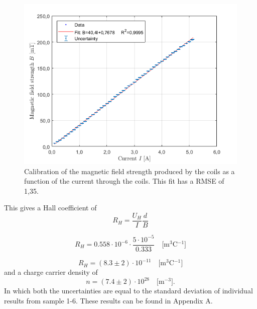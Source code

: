     \begin{figure}[!htbp]
    \begin{center}
    \includegraphics[scale=0.9]{figuren/resultaten/call_result.png}
    \end{center}
    \caption{Calibration of the magnetic field strength produced by the coils as a function of the current through the coils. This fit has a RMSE of 1,35.}\label{fig:call_result}
    \end{figure}
This gives a Hall coefficient of
    \begin{equation}
        R_H = \frac{U_H}{I} \frac{d}{B}
    \end{equation}
    
    \begin{equation}
        R_H = 0.558 \cdot 10^{-6} \cdot \frac{5\cdot 10^{-5}}{0.333} \quad \text{[m$^3$C$^{-1}$]}
    \end{equation}
    
    \begin{equation}
        R_H = (8.3 \pm 2) \cdot 10^{-11} \quad \text{[m$^3$C$^{-1}$]}
    \end{equation}
and a charge carrier density of
    \begin{equation}
        n = (7.4 \pm 2)\cdot 10^{28} \quad \text{[m$^{-3}$]}.
    \end{equation}
In which both the uncertainties are equal to the standard deviation of individual results from sample 1-6. These results can be found in Appendix A.

